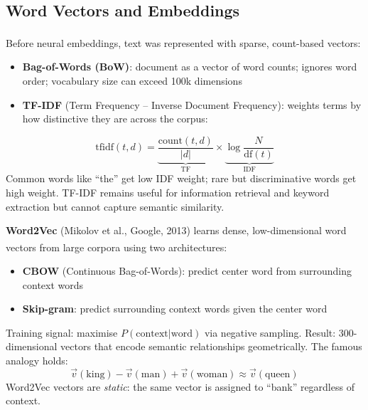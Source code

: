 \subsection{Word Vectors and Embeddings}

\begin{tcbitemize}[ skin=sectionraster ]
    \tcbitem[title={Classical Text Representations}, raster multicolumn=3]
    Before neural embeddings, text was represented with sparse, count-based vectors\textsuperscript{\cite[][p.~34]{farrisHowLargeLanguage2025}}:
    \begin{itemize}
        \item \textbf{Bag-of-Words (BoW)}: document as a vector of word counts; ignores word order; vocabulary size can exceed 100k dimensions
        \item \textbf{TF-IDF} (Term Frequency -- Inverse Document Frequency): weights terms by how distinctive they are across the corpus:
    \end{itemize}
    \begin{equation}
        \mathrm{tfidf}(t, d) = \underbrace{\frac{\text{count}(t,d)}{|d|}}_{\text{TF}} \times \underbrace{\log\frac{N}{\text{df}(t)}}_{\text{IDF}}
    \end{equation}
    Common words like ``the'' get low IDF weight; rare but discriminative words get high weight.
    TF-IDF remains useful for information retrieval and keyword extraction but cannot capture semantic similarity.

    \tcbitem[title={Word2Vec: Learning Dense Embeddings}, raster multicolumn=3]
    \textbf{Word2Vec} (Mikolov et al., Google, 2013) learns dense, low-dimensional word vectors from large corpora using two architectures\textsuperscript{\cite[][p.~36]{farrisHowLargeLanguage2025}}:
    \begin{itemize}
        \item \textbf{CBOW} (Continuous Bag-of-Words): predict center word from surrounding context words
        \item \textbf{Skip-gram}: predict surrounding context words given the center word
    \end{itemize}
    Training signal: maximise $P(\text{context}|\text{word})$ via negative sampling.
    Result: 300-dimensional vectors that encode semantic relationships geometrically.
    The famous analogy holds:
    \begin{equation}
        \vec{v}(\text{king}) - \vec{v}(\text{man}) + \vec{v}(\text{woman}) \approx \vec{v}(\text{queen})
    \end{equation}
    Word2Vec vectors are \emph{static}: the same vector is assigned to ``bank'' regardless of context.


\end{tcbitemize}

